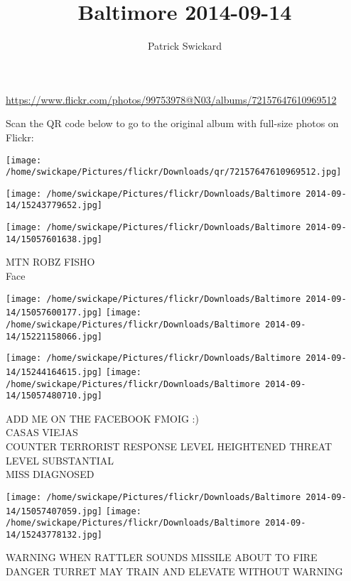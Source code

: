 \documentclass[10pt,letterpaper]{article}
\title{Baltimore 2014-09-14}
\author{Patrick Swickard}
\date{}
\begin{document}
\maketitle

\url{https://www.flickr.com/photos/99753978@N03/albums/72157647610969512}

Scan the QR code below to go to the original album with full-size photos on Flickr:

\texttt{[image: /home/swickape/Pictures/flickr/Downloads/qr/72157647610969512.jpg]}
\pagebreak

\texttt{[image: /home/swickape/Pictures/flickr/Downloads/Baltimore 2014-09-14/15243779652.jpg]}

\vspace{0.25in}
\texttt{[image: /home/swickape/Pictures/flickr/Downloads/Baltimore 2014-09-14/15057601638.jpg]}

MTN ROBZ FISHO\\
Face
\pagebreak

\texttt{[image: /home/swickape/Pictures/flickr/Downloads/Baltimore 2014-09-14/15057600177.jpg]}
\texttt{[image: /home/swickape/Pictures/flickr/Downloads/Baltimore 2014-09-14/15221158066.jpg]}

\texttt{[image: /home/swickape/Pictures/flickr/Downloads/Baltimore 2014-09-14/15244164615.jpg]}
\texttt{[image: /home/swickape/Pictures/flickr/Downloads/Baltimore 2014-09-14/15057480710.jpg]}

ADD ME ON THE FACEBOOK FMOIG :)\\
CASAS VIEJAS\\
COUNTER TERRORIST RESPONSE LEVEL HEIGHTENED THREAT LEVEL SUBSTANTIAL\\
MISS DIAGNOSED
\pagebreak

\texttt{[image: /home/swickape/Pictures/flickr/Downloads/Baltimore 2014-09-14/15057407059.jpg]}
\texttt{[image: /home/swickape/Pictures/flickr/Downloads/Baltimore 2014-09-14/15243778132.jpg]}

WARNING WHEN RATTLER SOUNDS MISSILE ABOUT TO FIRE\\
DANGER TURRET MAY TRAIN AND ELEVATE WITHOUT WARNING
\pagebreak
\end{document}
